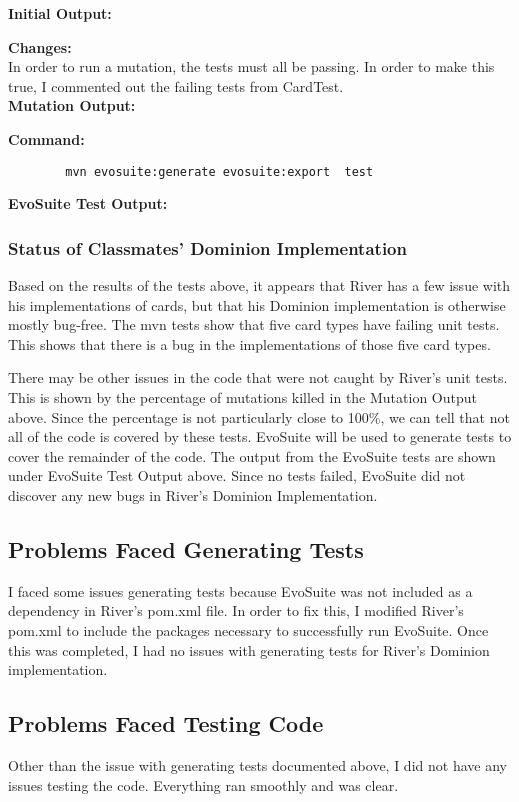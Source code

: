 \documentclass[letterpaper,10pt]{article}
\begin{document}
		\textbf{Initial Output: }
		

		\textbf{Changes: }\\
		In order to run a mutation, the tests must all be passing. In order to make this true,
		 I commented out the failing tests from CardTest.\\

		\textbf{Mutation Output: }
		

		\textbf{Command:}
		\begin{lstlisting}
		mvn evosuite:generate evosuite:export  test 
		\end{lstlisting}

		\textbf{EvoSuite Test Output:}
		

		\subsubsection{Status of Classmates' Dominion Implementation}
		Based on the results of the tests above, it appears that River has a few issue 
		with his implementations of cards, but that his Dominion implementation is 
		otherwise mostly bug-free. The mvn tests show that five card types have failing 
		unit tests. This shows that there is a bug in the implementations of those five 
		card types. 

		There may be other issues in the code that were not caught by River's unit tests. 
		This is shown by the percentage of mutations killed in the Mutation Output above. 
		Since the percentage is not particularly close to 100\%, we can tell that not all 
		of the code is covered by these tests. EvoSuite will be used to generate tests 
		to cover the remainder of the code. The output from the EvoSuite tests are shown 
		under EvoSuite Test Output above. Since no tests failed, EvoSuite did not 
		discover any new bugs in River's Dominion Implementation.
	\subsection{Problems Faced Generating Tests}
	I faced some issues generating tests because EvoSuite was not included as a dependency in 
	 River's pom.xml file. In order to fix this, I modified River's pom.xml to include the 
	packages necessary to successfully run EvoSuite. Once this was completed, I had no issues 
	with generating tests for River's Dominion implementation.
	\subsection{Problems Faced Testing Code}
	Other than the issue with generating tests documented above, I did not have any issues 
	testing the code. Everything ran smoothly and was clear.
\end{document}
